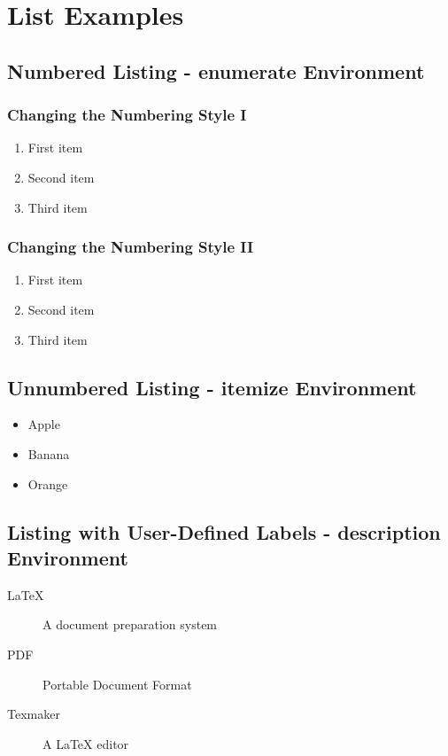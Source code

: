 \documentclass{article}
\begin{document}
\section{List Examples}

\subsection{Numbered Listing - enumerate Environment}
\subsubsection{Changing the Numbering Style I}
\begin{enumerate}
    \item First item
    \item Second item
    \item Third item
\end{enumerate}

\subsubsection{Changing the Numbering Style II}
\begin{enumerate}
    \renewcommand{\labelenumi}{\Roman{enumi}.} %
    \item First item
    \item Second item
    \item Third item
\end{enumerate}

\subsection{Unnumbered Listing - itemize Environment}
\begin{itemize}
    \item Apple
    \item Banana
    \item Orange
\end{itemize}

\subsection{Listing with User-Defined Labels - description Environment}
\begin{description}
    \item[LaTeX] A document preparation system
    \item[PDF] Portable Document Format
    \item[Texmaker] A LaTeX editor
\end{description}
\end{document}
